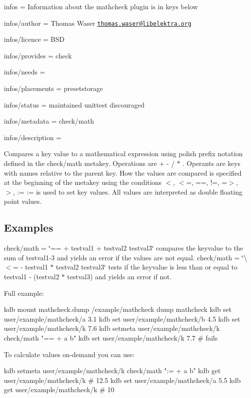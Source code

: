 
\begin{DoxyItemize}
\item infos = Information about the mathcheck plugin is in keys below
\item infos/author = Thomas Waser \href{mailto:thomas.waser@libelektra.org}{\tt thomas.\+waser@libelektra.\+org}
\item infos/licence = B\+S\+D
\item infos/provides = check
\item infos/needs =
\item infos/placements = presetstorage
\item infos/status = maintained unittest discouraged
\item infos/metadata = check/math
\item infos/description =
\end{DoxyItemize}

Compares a key value to a mathematical expression using polish prefix notation defined in the {\ttfamily check/math} metakey. Operations are {\ttfamily + -\/ / $\ast$} . Operants are keys with names relative to the parent key. How the values are compared is specified at the beginning of the metakey using the conditions {\ttfamily $<$, $<$=, ==, !=, =$>$, $>$, \+:=} {\ttfamily \+:=} is used to set key values. All values are interpreted as {\ttfamily double} floating point values.

\subsection*{Examples}

{\ttfamily check/math = \char`\"{}== + testval1 + testval2 testval3\char`\"{}} compares the keyvalue to the sum of testval1-\/3 and yields an error if the values are not equal. {\ttfamily check/math = \char`\"{}\textbackslash{}$<$= -\/ testval1 $\ast$ testval2 testval3\char`\"{}} tests if the keyvalue is less than or equal to testval1 -\/ (testval2 $\ast$ testval3) and yields an error if not.

Full example\+: \begin{DoxyVerb}    kdb mount mathcheck.dump /example/mathcheck dump mathcheck
    kdb set user/example/mathcheck/a 3.1
    kdb set user/example/mathcheck/b 4.5
    kdb set user/example/mathcheck/k 7.6
    kdb setmeta user/example/mathcheck/k check/math "== + a b"
    kdb set user/example/mathcheck/k 7.7   # fails
\end{DoxyVerb}


To calculate values on-\/demand you can use\+: \begin{DoxyVerb}    kdb setmeta user/example/mathcheck/k check/math ":= + a b"
    kdb get user/example/mathcheck/k       # 12.5
    kdb set user/example/mathcheck/a 5.5
    kdb get user/example/mathcheck/k       # 10
\end{DoxyVerb}



